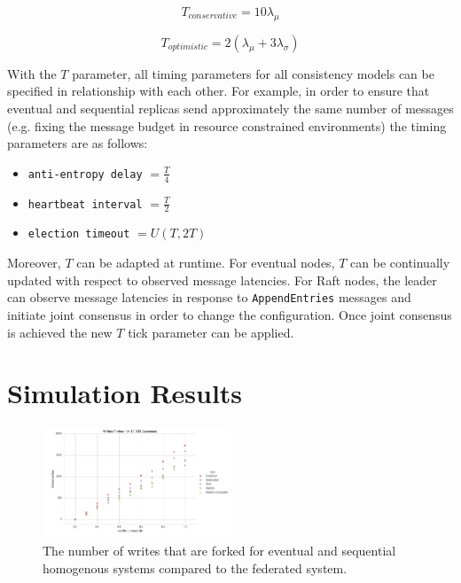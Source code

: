 \documentclass[10pt,conference,compsocconf,letterpaper]{IEEEtran}
\begin{document}
\begin{equation}
    T_{conservative} = 10\lambda_{\mu}
\end{equation}

\begin{equation}
    T_{optimistic} = 2(\lambda_{\mu} + 3\lambda_{\sigma})
\end{equation}

With the $T$ parameter, all timing parameters for all consistency models can be specified in relationship with each other. For example, in order to ensure that eventual and sequential replicas send approximately the same number of messages (e.g. fixing the message budget in resource constrained environments) the timing parameters are as follows:

\begin{itemize}
    \item \texttt{anti-entropy delay} $= \frac{T}{4}$
    \item \texttt{heartbeat interval} $= \frac{T}{2}$
    \item \texttt{election timeout} $= U(T, 2T)$
\end{itemize}

Moreover, $T$ can be adapted at runtime. For eventual nodes, $T$ can be continually updated with respect to observed message latencies. For Raft nodes, the leader can observe message latencies in response to \texttt{AppendEntries} messages and initiate joint consensus in order to change the configuration. Once joint consensus is achieved the new $T$ tick parameter can be applied.

\section{Simulation Results}

\begin{figure}[h]
    \centering
    \includegraphics[width=0.5\textwidth]{figures/forked_writes}
    \caption{The number of writes that are forked for eventual and sequential homogenous systems compared to the federated system.}
    \label{fig:forked_writes}
\end{figure}
\end{document}
